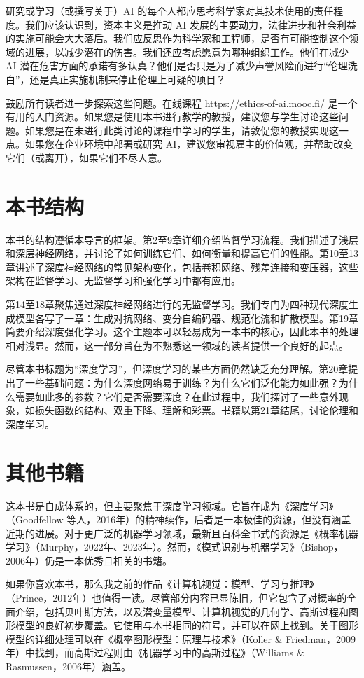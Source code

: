 研究或学习（或撰写关于）AI 的每个人都应思考科学家对其技术使用的责任程度。我们应该认识到，资本主义是推动 AI 发展的主要动力，法律进步和社会利益的实施可能会大大落后。我们应反思作为科学家和工程师，是否有可能控制这个领域的进展，以减少潜在的伤害。我们还应考虑愿意为哪种组织工作。他们在减少 AI 潜在危害方面的承诺有多认真？他们是否只是为了减少声誉风险而进行“伦理洗白”，还是真正实施机制来停止伦理上可疑的项目？

鼓励所有读者进一步探索这些问题。在线课程 https://ethics-of-ai.mooc.fi/ 是一个有用的入门资源。如果您是使用本书进行教学的教授，建议您与学生讨论这些问题。如果您是在未进行此类讨论的课程中学习的学生，请敦促您的教授实现这一点。如果您在企业环境中部署或研究 AI，建议您审视雇主的价值观，并帮助改变它们（或离开），如果它们不尽人意。
\section{本书结构}
本书的结构遵循本导言的框架。第2至9章详细介绍监督学习流程。我们描述了浅层和深层神经网络，并讨论了如何训练它们、如何衡量和提高它们的性能。第10至13章讲述了深度神经网络的常见架构变化，包括卷积网络、残差连接和变压器，这些架构在监督学习、无监督学习和强化学习中都有应用。

第14至18章聚焦通过深度神经网络进行的无监督学习。我们专门为四种现代深度生成模型各写了一章：生成对抗网络、变分自编码器、规范化流和扩散模型。第19章简要介绍深度强化学习。这个主题本可以轻易成为一本书的核心，因此本书的处理相对浅显。然而，这一部分旨在为不熟悉这一领域的读者提供一个良好的起点。

尽管本书标题为“深度学习”，但深度学习的某些方面仍然缺乏充分理解。第20章提出了一些基础问题：为什么深度网络易于训练？为什么它们泛化能力如此强？为什么需要如此多的参数？它们是否需要深度？在此过程中，我们探讨了一些意外现象，如损失函数的结构、双重下降、理解和彩票。书籍以第21章结尾，讨论伦理和深度学习。
\section{其他书籍}
这本书是自成体系的，但主要聚焦于深度学习领域。它旨在成为《深度学习》（Goodfellow 等人，2016年）的精神续作，后者是一本极佳的资源，但没有涵盖近期的进展。对于更广泛的机器学习领域，最新且百科全书式的资源是《概率机器学习》（Murphy，2022年、2023年）。然而，《模式识别与机器学习》（Bishop，2006年）仍是一本优秀且相关的书籍。

如果你喜欢本书，那么我之前的作品《计算机视觉：模型、学习与推理》（Prince，2012年）也值得一读。尽管部分内容已显陈旧，但它包含了对概率的全面介绍，包括贝叶斯方法，以及潜变量模型、计算机视觉的几何学、高斯过程和图形模型的良好初步覆盖。它使用与本书相同的符号，并可以在网上找到。关于图形模型的详细处理可以在《概率图形模型：原理与技术》（Koller \& Friedman，2009年）中找到，而高斯过程则由《机器学习中的高斯过程》（Williams \& Rasmussen，2006年）涵盖。

